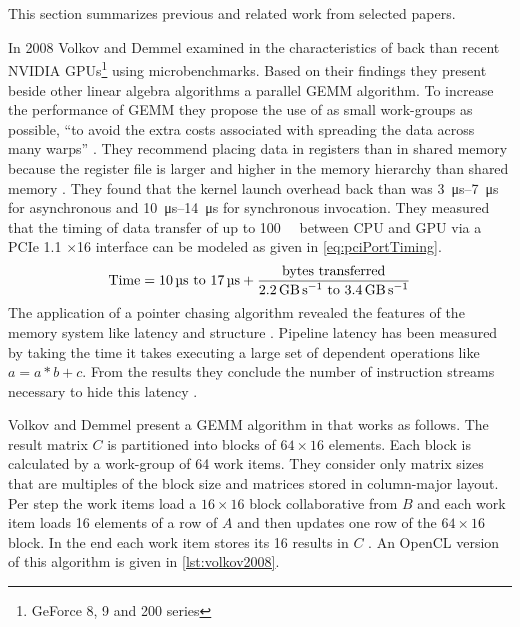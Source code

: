 \section{}
This section summarizes previous and related work from selected papers.

In 2008 Volkov and Demmel examined in \cite{Volkov2008} the characteristics of 
back than recent NVIDIA \acp{GPU}\footnote{GeForce 8, 9 and 200 series} using 
microbenchmarks. Based on their findings they present beside other linear 
algebra algorithms a parallel \ac{GEMM} algorithm.
To increase the performance of \ac{GEMM} they propose the use of as small 
work-groups as possible, ``to avoid the extra costs associated with spreading 
the data across many warps'' \cite[Section 2.2]{Volkov2008}. They recommend 
placing data in registers than in shared memory because the register file is 
larger and higher in the memory hierarchy than shared memory \cite[Section 
2.3]{Volkov2008}. They found that the kernel launch overhead back than was 
\SIrange{3}{7}{\micro\second} for asynchronous and 
\SIrange{10}{14}{\micro\second} for synchronous invocation. They measured 
that the timing of data transfer of up to \SI{100}{\mega\byte} between 
\acs{CPU} and \acs{GPU} via a \acs{PCIe} 1.1 $\times$16 interface can be 
modeled as given in \cref{eq:pciPortTiming}.
\begin{equation}
 \label{eq:pciPortTiming}
 \text{Time} = \text{\SIrange{10}{17}{\micro\second}} + \frac{\text{bytes 
transferred}}{\text{\SIrange{2.2}{3.4}{\giga\byte\per\second}}}
\end{equation}
The application of a pointer chasing algorithm revealed the features of the 
memory system like latency and structure \cite[Section 3.3]{Volkov2008}. 
Pipeline latency has been measured by taking the time it takes executing a 
large set of dependent operations like $a = a * b + c$. From the results they 
conclude the number of instruction streams necessary to hide this latency 
\cite[Section 3.4]{Volkov2008}.

Volkov and Demmel present a \ac{GEMM} algorithm in that works 
as follows. The result matrix $C$ is partitioned into blocks of $64 \times 16$ 
elements. Each block is calculated by a work-group of 64 work items. They 
consider only matrix sizes that are multiples of the block size and matrices 
stored in column-major layout. Per step the work items load a $16 \times 16$ 
block collaborative from $B$ and each work item loads 16 elements of a row of 
$A$ and then updates one row of the $64 \times 16$ block. In the end each 
work item stores its 16 results in $C$ \cite[Section 4]{Volkov2008}. An OpenCL 
version of this algorithm is given in \cref{lst:volkov2008}.




